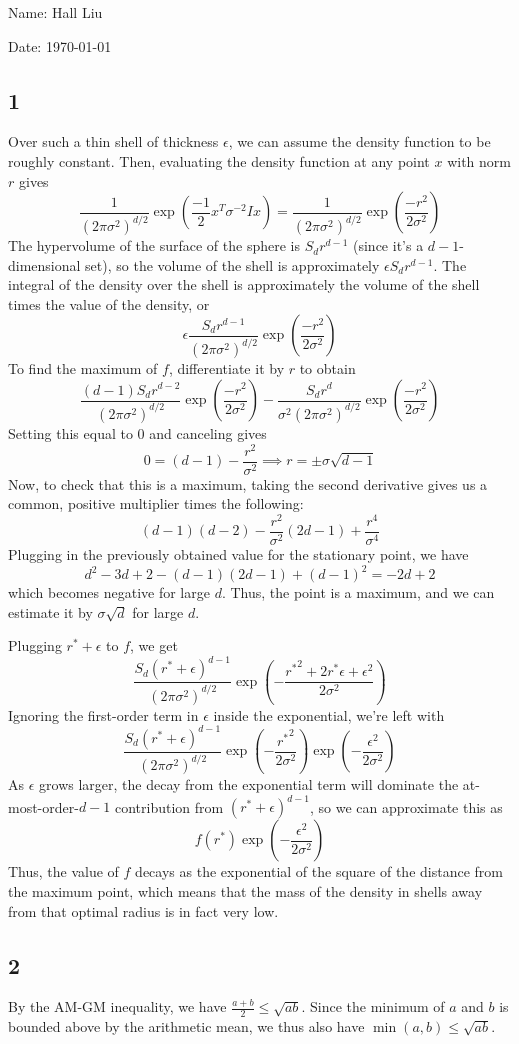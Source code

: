 \documentclass{article}
\newcommand{\ep}{\epsilon}
\begin{document}
Name: Hall Liu

Date: \today 
\vspace{1.5cm}
\subsection*{1}
Over such a thin shell of thickness $\ep$, we can assume the density function to be roughly constant. Then, evaluating the density function at any point $x$ with norm $r$ gives
\[\frac{1}{(2\pi\sigma^2)^{d/2}}\exp\left(\frac{-1}{2}x^T\sigma^{-2}Ix\right)=\frac{1}{(2\pi\sigma^2)^{d/2}}\exp\left(\frac{-r^2}{2\sigma^2}\right)\]
The hypervolume of the surface of the sphere is $S_dr^{d-1}$ (since it's a $d-1$-dimensional set), so the volume of the shell is approximately $\ep S_dr^{d-1}$. The integral of the density over the shell is approximately the volume of the shell times the value of the density, or 
\[\ep\frac{S_dr^{d-1}}{(2\pi\sigma^2)^{d/2}}\exp\left(\frac{-r^2}{2\sigma^2}\right)\]
To find the maximum of $f$, differentiate it by $r$ to obtain
\[\frac{(d-1)S_dr^{d-2}}{(2\pi\sigma^2)^{d/2}}\exp\left(\frac{-r^2}{2\sigma^2}\right)-\frac{S_dr^d}{\sigma^2(2\pi\sigma^2)^{d/2}}\exp\left(\frac{-r^2}{2\sigma^2}\right)\]
Setting this equal to $0$ and canceling gives
\[0=(d-1)-\frac{r^2}{\sigma^2}\implies r=\pm\sigma\sqrt{d-1}\]
Now, to check that this is a maximum, taking the second derivative gives us a common, positive multiplier times the following:
\[(d-1)(d-2)-\frac{r^2}{\sigma^2}(2d-1)+\frac{r^4}{\sigma^4}\]
Plugging in the previously obtained value for the stationary point, we have
\[d^2-3d+2-(d-1)(2d-1)+(d-1)^2=-2d+2\]
which becomes negative for large $d$. Thus, the point is a maximum, and we can estimate it by $\sigma\sqrt{d}$ for large $d$.

Plugging $r^*+\ep$ to $f$, we get 
\[\frac{S_d(r^*+\ep)^{d-1}}{(2\pi\sigma^2)^{d/2}}\exp\left(-\frac{{r^*}^2+2r^*\ep+\ep^2}{2\sigma^2}\right)\]
Ignoring the first-order term in $\ep$ inside the exponential, we're left with
\[\frac{S_d(r^*+\ep)^{d-1}}{(2\pi\sigma^2)^{d/2}}\exp\left(-\frac{{r^*}^2}{2\sigma^2}\right)\exp\left(-\frac{\ep^2}{2\sigma^2}\right)\]
As $\ep$ grows larger, the decay from the exponential term will dominate the at-most-order-$d-1$ contribution from $(r^*+\ep)^{d-1}$, so we can approximate this as 
\[f(r^*)\exp\left(-\frac{\ep^2}{2\sigma^2}\right)\]
Thus, the value of $f$ decays as the exponential of the square of the distance from the maximum point, which means that the mass of the density in shells away from that optimal radius is in fact very low.
\subsection{2}
By the AM-GM inequality, we have $\frac{a+b}{2}\leq\sqrt{ab}$. Since the minimum of $a$ and $b$ is bounded above by the arithmetic mean, we thus also have $\min(a,b)\leq\sqrt{ab}$. 
\end{document}
